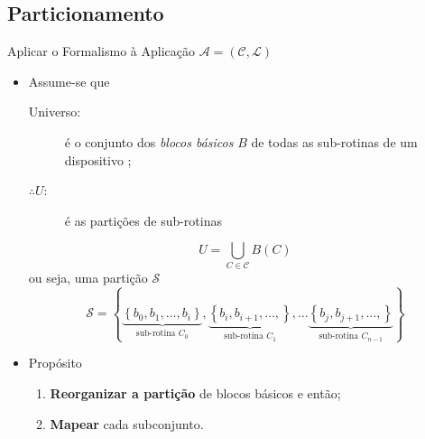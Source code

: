    \subsection{Particionamento}
      \begin{frame}{Aplicar o Formalismo à Aplicação $\mathcal{A} = (\mathcal{C}, \mathcal{L})$}
         \begin{itemize}
            \item Assume-se que
            \begin{description}
               \item [Universo:] é o conjunto dos \textit{blocos básicos} $B$ de todas as sub-rotinas de um dispositivo \wearable;
               
               \item [$\therefore U$:] é as partições de sub-rotinas
            \end{description}
            
            \begin{equation}
               U = \bigcup_{C \in \mathcal{C}} B(C) \label{eq:bigcup}
            \end{equation}
            ou seja, uma partição $\mathcal{S}$
            \begin{equation}
               \mathcal{S}  = \left \{
               \underbrace{\left \{ b_0, b_1, \dots, b_i \right \}}_{\text{sub-rotina }C_0},
               \underbrace{\left \{ b_i, b_{i+1}, \dots, \right \}}_{\text{sub-rotina }C_1},\dots
               \underbrace{\left \{ b_j, b_{j+1}, \dots, \right \}}_{\text{sub-rotina }C_{n-1}}
               \right \}
            \end{equation}
   
            \item Propósito
            \begin{enumerate}
               \item \textbf{Reorganizar a partição} de blocos básicos e então;
               \item \textbf{Mapear} cada subconjunto.
            \end{enumerate}
   
         \end{itemize}
      \end{frame}
   
   
   
